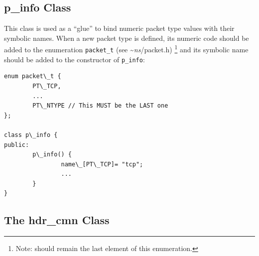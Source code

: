 \subsection{p\_info Class}
\label{sec:pinfoclass}

This class is used as a ``glue'' to bind numeric packet type values
with their symbolic names.  When a new packet type is defined, its
numeric code should be added to the enumeration {\tt packet\_t} (see
\textasciitilde\emph{ns}/{packet.h}) \footnote{Note:  should remain the last element of this
enumeration.} and its symbolic name should be added to the constructor
of {\tt p\_info}:
\begin{verbatim}
enum packet\_t {
        PT\_TCP,
        ...
        PT\_NTYPE // This MUST be the LAST one
};

class p\_info {
public:
        p\_info() {
                name\_[PT\_TCP]= "tcp";
                ...
        }
}
\end{verbatim}
\subsection{The hdr\_cmn Class}
\label{sec:commonhdr}

